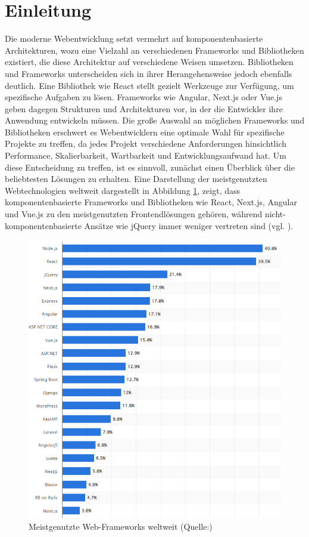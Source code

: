\documentclass[oneside]{ausarbeitung}
\begin{document}
\section{Einleitung}
Die moderne Webentwicklung setzt vermehrt auf komponentenbasierte Architekturen, wozu eine Vielzahl an verschiedenen Frameworks und Bibliotheken existiert, die diese Architektur auf verschiedene Weisen umsetzen. Bibliotheken und Frameworks unterscheiden sich in ihrer Herangehensweise jedoch ebenfalls deutlich. Eine Bibliothek wie React stellt gezielt Werkzeuge zur Verfügung, um spezifische Aufgaben zu lösen. Frameworks wie Angular, Next.js oder Vue.js geben dagegen Strukturen und Architekturen vor, in der die Entwickler ihre Anwendung entwickeln müssen. 
Die große Auswahl an möglichen Frameworks und Bibliotheken erschwert es Webentwicklern eine optimale Wahl für spezifische Projekte zu treffen, da jedes Projekt verschiedene Anforderungen hinsichtlich Performance, Skalierbarkeit, Wartbarkeit und Entwicklungsaufwand hat. Um diese Entscheidung zu treffen, ist es sinnvoll, zunächst einen Überblick über die beliebtesten Lösungen zu erhalten. Eine Darstellung der meistgenutzten Webtechnologien weltweit dargestellt in Abbildung \ref{fig:frameworks}, zeigt, dass komponentenbasierte Frameworks und Bibliotheken wie React, Next.js, Angular und Vue.js zu den meistgenutzten Frontendlösungen gehören, während nicht-komponentenbasierte Ansätze wie jQuery immer weniger vertreten sind (vgl. \parencite{statista2024}).

\begin{figure}[H]
    \centering
    \includegraphics[width=\textwidth]{images/web-frameworks.png}
    \caption{Meistgenutzte Web-Frameworks weltweit (Quelle:\parencite{statista2024})}
    \label{fig:frameworks}
\end{figure}
\end{document}
